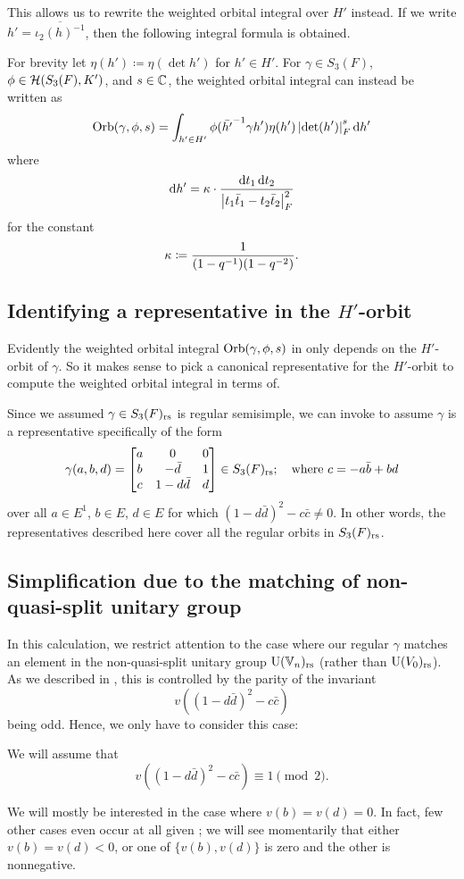 This allows us to rewrite the weighted orbital integral over $H'$ instead.
If we write $h' = \overline{\iota_2(h)^{-1}}$,
then the following integral formula is obtained.
\begin{proposition}
  \label{prop:orbital_over_H_prime}
  For brevity let $\eta(h') \coloneqq \eta(\det h')$ for $h' \in H'$.
  For $\gamma \in S_3(F)$, $\phi \in \mathcal H(S_3(F), K')$, and $s \in \mathbb C$,
  the weighted orbital integral can instead be written as
  \[ \Orb(\gamma, \phi, s) =
    \int_{h' \in H'} \phi(\bar{h'}\inv \gamma h') \eta(h')
    \left\lvert \det(h') \right\rvert_F^{s} \odif{h'} \]
  where
  \[ \odif{h'} = \kappa \cdot \frac{\odif t_1 \odif t_2}
    {\left\lvert t_1 \bar t_1 - t_2 \bar t_2 \right\rvert_F^2} \]
  for the constant
  \[ \kappa \coloneqq \frac{1}{(1-q^{-1})(1-q^{-2})}. \]
\end{proposition}

\subsection{Identifying a representative in the $H'$-orbit}
Evidently the weighted orbital integral $\operatorname{Orb}(\gamma, \phi, s)$ in 
only depends on the $H'$-orbit of $\gamma$.
So it makes sense to pick a canonical representative for the $H'$-orbit to compute
the weighted orbital integral in terms of.

Since we assumed $\gamma \in S_3(F)_{\mathrm{rs}}$ is regular semisimple,
we can invoke \cite[Proposition 4.1]{ref:AFL}
to assume $\gamma$ is a representative specifically of the form
\[ \gamma(a,b,d) =
  \begin{bmatrix}
    a & 0 & 0 \\
    b & - \bar d & 1 \\
    c & 1 - d \bar d & d
  \end{bmatrix}
  \in S_3(F)_{\mathrm{rs}}; \quad \text{where $c = -a \bar b + b d$} \]
over all $a \in E^1$, $b \in E$, $d \in E$ for which $(1-d\bar d)^2 - c \bar c \neq 0$.
In other words, the representatives described here cover all the regular orbits in $S_3(F)_{\mathrm{rs}}$.

\subsection{Simplification due to the matching of non-quasi-split unitary group}
In this calculation, we restrict attention to the case where our regular $\gamma$
matches an element in the non-quasi-split unitary group $\operatorname{U}(\mathbb V_n)_{\mathrm{rs}}$
(rather than $\operatorname{U}(V_0)_{\mathrm{rs}}$).
As we described in ,
this is controlled by the parity of the invariant
\[ v\left( (1-d\bar d)^2 - c \bar c\right) \]
being odd.
Hence, we only have to consider this case:
\begin{assume}
  \label{assume:u_odd}
  We will assume that
  \[ v\left( (1-d\bar d)^2 - c \bar c\right) \equiv 1 \pmod 2. \]
\end{assume}
We will mostly be interested in the case where $v(b) = v(d) = 0$.
In fact, few other cases even occur at all given ;
we will see momentarily that either $v(b) = v(d) < 0$,
or one of $\{v(b), v(d)\}$ is zero and the other is nonnegative.

